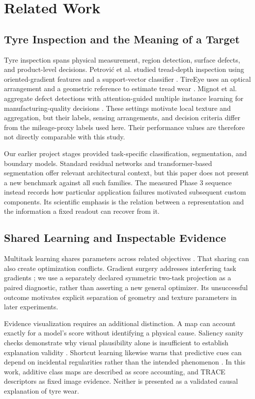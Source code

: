 \section{Related Work}\label{sec:related}
\subsection{Tyre Inspection and the Meaning of a Target}
Tyre inspection spans physical measurement, region detection, surface defects, and product-level decisions. Petrovi\'{c} et al. studied tread-depth inspection using oriented-gradient features and a support-vector classifier \cite{tread2021}. TireEye uses an optical arrangement and a geometric reference to estimate tread wear \cite{tireeye}. Mignot et al. aggregate defect detections with attention-guided multiple instance learning for manufacturing-quality decisions \cite{mil2025}. These settings motivate local texture and aggregation, but their labels, sensing arrangements, and decision criteria differ from the mileage-proxy labels used here. Their performance values are therefore not directly comparable with this study.\AIdraftingnote

Our earlier project stages provided task-specific classification, segmentation, and boundary models. Standard residual networks \cite{resnet} and transformer-based segmentation \cite{segformer} offer relevant architectural context, but this paper does not present a new benchmark against all such families. The measured Phase 3 sequence instead records how particular application failures motivated subsequent custom components. Its scientific emphasis is the relation between a representation and the information a fixed readout can recover from it.

\subsection{Shared Learning and Inspectable Evidence}
Multitask learning shares parameters across related objectives \cite{caruana}. That sharing can also create optimization conflicts. Gradient surgery addresses interfering task gradients \cite{pcgrad}; we use a separately declared symmetric two-task projection as a paired diagnostic, rather than asserting a new general optimizer. Its unsuccessful outcome motivates explicit separation of geometry and texture parameters in later experiments.

Evidence visualization requires an additional distinction. A map can account exactly for a model's score without identifying a physical cause. Saliency sanity checks demonstrate why visual plausibility alone is insufficient to establish explanation validity \cite{sanity}. Shortcut learning likewise warns that predictive cues can depend on incidental regularities rather than the intended phenomenon \cite{shortcuts}. In this work, additive class maps are described as score accounting, and TRACE descriptors as fixed image evidence. Neither is presented as a validated causal explanation of tyre wear.

